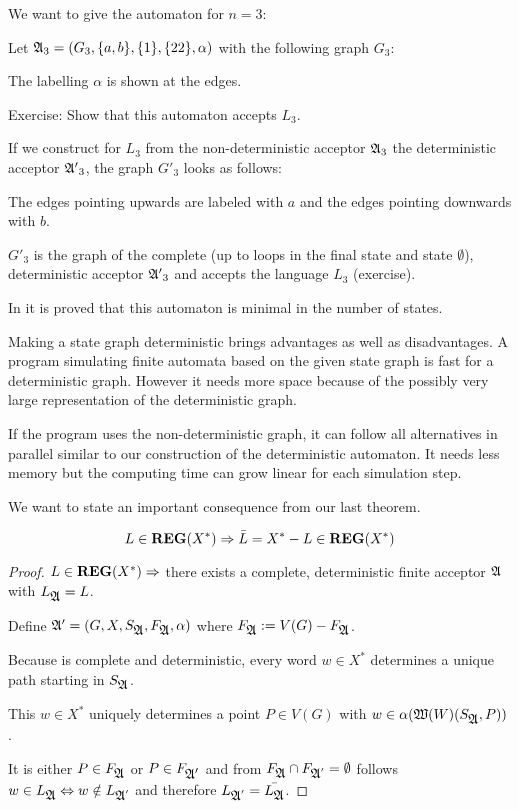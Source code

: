 We want to give the automaton for $n = 3$:

Let $\mbox{$\mathfrak{A}$}_3 = (G_3, \mbox{$\{a,b\}$}, \mbox{$\{1\}$}, \mbox{$\{22\}$}, \alpha)$ with the
following graph $G_3$:

\begin{center}

\end{center}

The labelling $\alpha$ is shown at the edges.

Exercise: Show that this automaton accepts $L_3$.

If we construct for $L_3$ from the non-deterministic acceptor $\mbox{$\mathfrak{A}$}_3$
the deterministic acceptor $\mbox{$\mathfrak{A'}$}_3$, the graph $G'_3$ looks as follows:

\missingfigure

The edges pointing upwards are labeled with $a$ and the edges pointing downwards
with $b$.

$G'_3$ is the graph of the complete (up to loops in the final state and state
$\emptyset$), deterministic acceptor $\mbox{$\mathfrak{A'}$}_3$ and accepts the language $L_3$
(exercise).

In \cite{Commentz} it is proved that this automaton is minimal in the number of
states.

Making a state graph deterministic brings advantages as well as disadvantages. A
program simulating finite automata based on the given state graph is fast for
a deterministic graph. However it needs more space because of the possibly very
large representation of the deterministic graph.

If the program uses the non-deterministic graph, it can follow all alternatives
in parallel similar to our construction of the deterministic automaton. It needs
less memory but the computing time can grow linear for each simulation step.

We want to state an important consequence from our last theorem.

\begin{theorem}
\[ L \in \mbox{{\bf REG}}(X^*) \Rightarrow \bar{L} = X^* - L \in \mbox{{\bf REG}}(X^*) \]
\end{theorem}

\begin{proof}
$L \in \mbox{{\bf REG}}(X^*) \Rightarrow $ there exists a complete, deterministic
finite acceptor $\mbox{$\mathfrak{A}$}$ with $L_{\mbox{$\mathfrak{A}$}} = L$.

Define $\mbox{$\mathfrak{A'}$} = (G, X, S_{\mbox{$\mathfrak{A}$}}, F_{\mbox{$\mathfrak{A}$}}, \alpha)$ where $F_{\mbox{$\mathfrak{A}$}} :=
V(G) - F_{\mbox{$\mathfrak{A}$}}$.

Because  is complete and deterministic, every word $w \in X^*$ determines
a unique path starting in $S_{\mbox{$\mathfrak{A}$}}$.

This $w \in X^*$ uniquely determines a point $P \in V(G)$ with $w \in
\alpha(\mbox{$\mathfrak{W}({W})$}(S_{\mbox{$\mathfrak{A}$}}, P))$.

It is either $P \in F_{\mbox{$\mathfrak{A}$}}$ or $P \in F_{\mbox{$\mathfrak{A'}$}}$ and from $F_{\mbox{$\mathfrak{A}$}}
\cap F_{\mbox{$\mathfrak{A}$}'} = \emptyset$ follows $w \in L_{\mbox{$\mathfrak{A}$}} \Leftrightarrow w
\notin L_{\mbox{$\mathfrak{A}$}'}$ and therefore $L_{\mbox{$\mathfrak{A}$}'} = \bar{L_{\mbox{$\mathfrak{A}$}}}$.
\end{proof}

